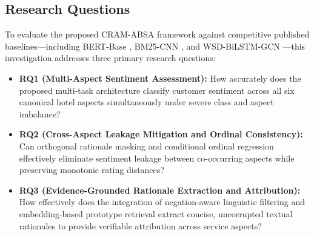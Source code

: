 \documentclass{llncs}
\begin{document}
\subsection{Research Questions}
\label{subsec:research_questions}
To evaluate the proposed CRAM-ABSA framework against competitive published baselines---including BERT-Base \cite{ref01_bimaputra2023}, BM25-CNN \cite{ref04_namee2023}, and WSD-BiLSTM-GCN \cite{ref09_nadeem2025}---this investigation addresses three primary research questions:
\begin{itemize}
    \item \textbf{RQ1 (Multi-Aspect Sentiment Assessment):} How accurately does the proposed multi-task architecture classify customer sentiment across all six canonical hotel aspects simultaneously under severe class and aspect imbalance?
    \item \textbf{RQ2 (Cross-Aspect Leakage Mitigation and Ordinal Consistency):} Can orthogonal rationale masking and conditional ordinal regression effectively eliminate sentiment leakage between co-occurring aspects while preserving monotonic rating distances?
    \item \textbf{RQ3 (Evidence-Grounded Rationale Extraction and Attribution):} How effectively does the integration of negation-aware linguistic filtering and embedding-based prototype retrieval extract concise, uncorrupted textual rationales to provide verifiable attribution across service aspects?
\end{itemize}
\end{document}
